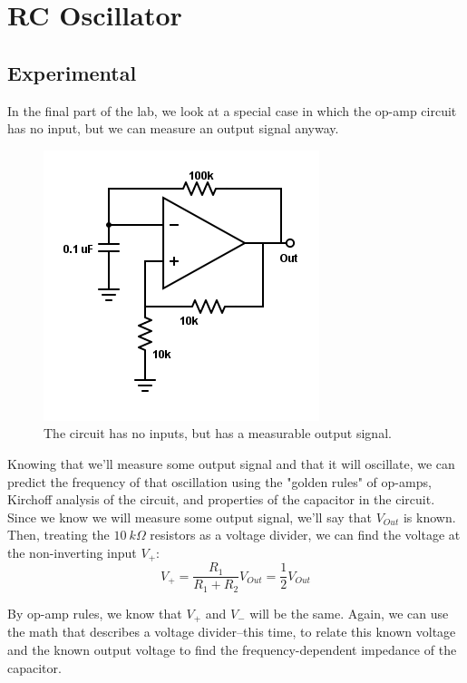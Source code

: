 \documentclass[11pt]{article}
\begin{document}
\section{RC Oscillator}
\subsection{Experimental}

In the final part of the lab, we look at a special case in which the op-amp circuit has no input, but we can measure an output signal anyway.\\

\begin{figure}[H]
    \centering
    \includegraphics[scale=0.5]{Diagrams/c-f.png}
    \caption{The circuit has no inputs, but has a measurable output signal.}
    \label{circuit:f}
\end{figure}

Knowing that we'll measure some output signal and that it will oscillate, we can predict the frequency of that oscillation using the "golden rules" of op-amps, Kirchoff analysis of the circuit, and properties of the capacitor in the circuit.\\

Since we know we will measure some output signal, we'll say that $V_{Out}$ is known. Then, treating the $10\ k \Omega$ resistors as a voltage divider, we can find the voltage at the non-inverting input $V_+$:\\

\begin{equation}
    V_+ = \frac{R_1}{R_1 + R_2} V_{Out} = \frac{1}{2} V_{Out}
\end{equation}

By op-amp rules, we know that $V_+$ and $V_-$ will be the same. Again, we can use the math that describes a voltage divider--this time, to relate this known voltage and the known output voltage to find the frequency-dependent impedance of the capacitor.\\
\end{document}
